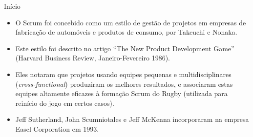\begin{frame}{Início}{\insertlecture}\footnotesize
\begin{itemize}[<+-| alert@+>]
\item O Scrum foi concebido como um estilo de gestão de
  projetos em empresas de fabricação de automóveis e produtos de
  consumo, por Takeuchi e Nonaka.
\item Este estilo foi descrito no artigo ``The New Product Development
  Game'' (Harvard Business Review, Janeiro-Fevereiro 1986).
\item Eles notaram que projetos usando equipes pequenas e
  multidisciplinares ({\em cross-functional}) produziram os melhores
  resultados, e associaram estas equipes altamente eficazes à formação
  Scrum do Rugby (utilizada para reinício do jogo em certos casos).
\item Jeff Sutherland, John Scumniotales e Jeff McKenna incorporaram
  na empresa Easel Corporation em 1993.
\end{itemize}


\end{frame}

